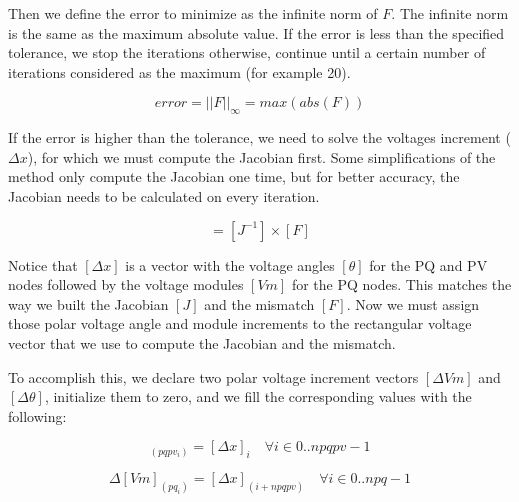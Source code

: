 \documentclass[nols,a4paper,twoside,notoc,fleqn]{tufte-book}
\begin{document}
Then we define the error to minimize as the infinite norm of $F$. The infinite norm is the same as the maximum absolute value. If the error is less than the specified tolerance, we stop the iterations otherwise, continue until a certain number of iterations considered as the maximum (for example 20).

\begin{equation}
error = ||F||_{\infty} = max(abs(F))
\label{eq:nr_error}
\end{equation}

If the error is higher than the tolerance, we need to solve the voltages increment ($\Delta x$), for which we must compute the Jacobian first. Some simplifications of the method only compute the Jacobian one time, but for better accuracy, the Jacobian needs to be calculated on every iteration.


\begin{equation}
[\Delta x] = [J^{-1}] \times [F]
\label{eq:nr_solve}
\end{equation}

Notice that $[\Delta x]$ is a vector with the voltage angles $[\theta]$ for the PQ and PV nodes followed by the voltage modules $[Vm]$ for the PQ nodes. This matches the way we built the Jacobian $[J]$ and the mismatch $[F]$. Now we must assign those polar voltage angle and module increments to the rectangular voltage vector that we use to compute the Jacobian and the mismatch.

To accomplish this, we declare two polar voltage increment vectors $[\Delta Vm]$ and $[\Delta \theta]$, initialize them to zero, and we fill the corresponding values with the following:


\begin{equation}
[\Delta \theta]_{(pqpv_i)} = [\Delta x]_i  \quad \forall i \in {0..npqpv-1}
\label{eq:nr_dd1}
\end{equation}

\begin{equation}
\Delta  [Vm]_{(pq_i)} = [\Delta x]_{(i+npqpv)}  \quad \forall i \in {0..npq-1}
\end{equation}
\end{document}
